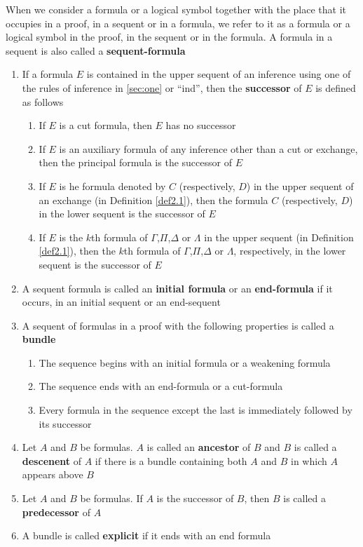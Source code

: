 \documentclass[11pt]{article}
\begin{document}
\begin{definition}[]
When we consider a formula or a logical symbol together with the place that it occupies in a
proof, in a sequent or in a formula, we refer to it as a formula or a logical symbol in the
proof, in the sequent or in the formula. A formula in a sequent is also called a
\textbf{sequent-formula}
\begin{enumerate}
\item If a formula \(E\) is contained in the upper sequent of an inference using one of the rules of
inference in \ref{sec:one} or ``ind'', then the \textbf{successor} of \(E\) is defined as follows
\begin{enumerate}
\item If \(E\) is a cut formula, then \(E\) has no successor
\item If \(E\) is an auxiliary formula of any inference other than a cut or exchange, then the
principal formula is the successor of \(E\)
\item If \(E\) is he formula denoted by \(C\) (respectively, \(D\)) in the upper sequent of an
exchange (in Definition \ref{def2.1}), then the formula \(C\) (respectively, \(D\)) in the
lower sequent is the successor of \(E\)
\item If \(E\) is the \(k\)th formula of \(\Gamma\),\(\Pi\),\(\Delta\) or \(\Lambda\) in the upper sequent (in Definition
\ref{def2.1}), then the \(k\)th formula of \(\Gamma\),\(\Pi\),\(\Delta\) or \(\Lambda\), respectively, in the lower sequent is
the successor of \(E\)
\end{enumerate}
\item A sequent formula is called an \textbf{initial formula} or an \textbf{end-formula} if it occurs, in an initial
sequent or an end-sequent
\item A sequent of formulas in a proof with the following properties is called a \textbf{bundle}
\begin{enumerate}
\item The sequence begins with an initial formula or a weakening formula
\item The sequence ends with an end-formula or a cut-formula
\item Every formula in the sequence except the last is immediately followed by its successor
\end{enumerate}
\item Let \(A\) and \(B\) be formulas. \(A\) is called an \textbf{ancestor} of \(B\) and \(B\) is called a
\textbf{descenent} of \(A\) if there is a bundle containing both \(A\) and \(B\) in which \(A\)
appears above \(B\)
\item Let \(A\) and \(B\)  be formulas. If \(A\) is the successor of \(B\), then \(B\) is called a
\textbf{predecessor} of \(A\)
\item A bundle is called \textbf{explicit} if it ends with an end formula


\end{enumerate}
\end{definition}
\end{document}
